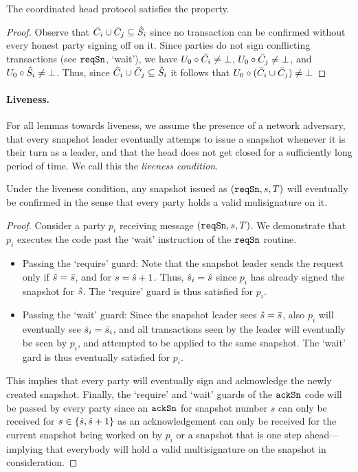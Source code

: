 \begin{lemma}[Consistency]
  \label{lem:consistency}
  The coordinated head protocol satisfies the  property.
\end{lemma}
\begin{proof}
  Observe that $\bar{C}_i\cup\bar{C}_j\subseteq\hat{S}_i$ since no
  transaction can be confirmed without every honest party signing off
  on it.  Since parties do not sign conflicting transactions
  (see $\mathtt{reqSn}$, `wait'), we have
  $U_{0}\circ\bar{C}_i\neq\bot$,
  $U_{0}\circ\bar{C}_j\neq\bot$, and
  $U_{0}\circ\hat{S}_i\neq\bot$.  Thus, since $\bar{C}_i\cup\bar{C}_j\subseteq\hat{S}_i$
  it follows that
  $U_{0}\circ(\bar{C}_i\cup\bar{C}_j)\neq\bot$
\end{proof}

\paragraph{Liveness.}
For all lemmas towards liveness, we assume the presence of a network adversary,
that every snapshot leader eventually attemps to issue a snapshot whenever it is
their turn as a leader, and that the head does not get closed for a sufficiently
long period of time.
We call this the \emph{liveness condition}.

\begin{lemma}\label{lem:reqconf}  
  Under the liveness condition, any snapshot issued as $(\mathtt{reqSn},s,T)$ will eventually be confirmed
  in the sense that every party holds a valid mulisignature on it.
\end{lemma}
\begin{proof}
  Consider a party $p_i$ receiving message $(\mathtt{reqSn},s,T)$. We demonstrate that $p_i$ executes
  the code past the `wait' instruction of the $\mathtt{reqSn}$ routine. 

  \begin{itemize}
   \item Passing the `require' guard:
  Note that the snapshot leader sends the request only if $\hat s=\bar s$, and for $s=\hat s+1$.
  Thus, $\hat s_i=\hat s$ since $p_i$ has already signed the snapshot for $\hat s$. The `require'
  guard is thus satisfied for $p_i$.

   \item Passing the `wait' guard:
  Since the snapshot leader sees $\hat s=\bar s$, also $p_i$ will eventually see $\hat s_i=\bar s_i$,
  and all transactions seen by the leader will eventually be seen by $p_i$, and attempted
  to be applied to the same snapshot. The `wait' gard is thus eventually satisfied for $p_i$.
  \end{itemize}

  This implies that every party will eventually sign and acknowledge the newly created snapshot.
  Finally, the `require' and `wait' guards of the $\mathtt{ackSn}$ code will be passed by every party
  since an $\mathtt{ackSn}$ for snapshot number $s$ can only be received for $s\in\{\hat s,\hat s+1\}$
  as an acknowledgement can only be received for the current snapshot being worked on by $p_i$
  or a snapshot that is one step ahead---implying that everybody will hold a valid multisignature
  on the snapshot in consideration.
\end{proof}

